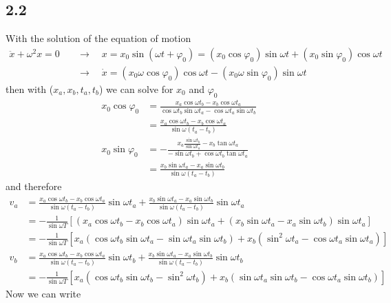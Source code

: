 \documentclass[../main.tex]{subfiles}
\begin{document}
\subsection{2.2}
With the solution of the equation of motion 
\begin{align}
    \ddot x+\omega^2x=0 &\quad\rightarrow\quad x=x_0\sin(\omega t+\varphi_0)=(x_0\cos\varphi_0)\sin \omega t+(x_0\sin\varphi_0)\cos\omega t\\
    &\quad\rightarrow\quad \dot x=(x_0\omega\cos\varphi_0)\cos \omega t-(x_0\omega\sin\varphi_0)\sin\omega t
\end{align}
then with ($x_a,x_b,t_a,t_b$) we can solve for $x_0$ and $\varphi_0$
\begin{align}
    x_0\cos\varphi_0
    &=\frac{x_a\cos\omega t_b-x_b\cos\omega t_a}{\cos\omega t_b\sin\omega t_a-\cos\omega t_a\sin\omega t_b}\\
    &=\frac{x_a\cos\omega t_b-x_b\cos\omega t_a}{\sin\omega(t_a-t_b)}\\
    x_0\sin\varphi_0&=-\frac{x_a\frac{\sin\omega t_b}{\sin\omega t_a}-x_b\tan\omega t_a}{-\sin\omega t_b+\cos\omega t_b\tan\omega t_a}\\
    &=\frac{x_b\sin\omega t_a-x_a\sin\omega t_b}{\sin\omega(t_a-t_b)}
\end{align}
and therefore
\begin{align}
    v_a&=\frac{x_a\cos\omega t_b-x_b\cos\omega t_a}{\sin\omega(t_a-t_b)}\sin\omega t_a+\frac{x_b\sin\omega t_a-x_a\sin\omega t_b}{\sin\omega(t_a-t_b)}\sin\omega t_a\\
    &=-\frac{1}{\sin\omega T}\left[(x_a\cos\omega t_b-x_b\cos\omega t_a)\sin\omega t_a+(x_b\sin\omega t_a-x_a\sin\omega t_b)\sin\omega t_a\right]\\
    &=-\frac{1}{\sin\omega T}\left[x_a(\cos\omega t_b\sin\omega t_a-\sin\omega t_a\sin\omega t_b)+x_b(\sin^2\omega t_a-\cos\omega t_a\sin\omega t_a)\right]\\
    v_b&=\frac{x_a\cos\omega t_b-x_b\cos\omega t_a}{\sin\omega(t_a-t_b)}\sin\omega t_b+\frac{x_b\sin\omega t_a-x_a\sin\omega t_b}{\sin\omega(t_a-t_b)}\sin\omega t_b\\
    &=-\frac{1}{\sin\omega T}\left[x_a(\cos\omega t_b\sin\omega t_b-\sin^2\omega t_b)+x_b(\sin\omega t_a\sin\omega t_b-\cos\omega t_a\sin\omega t_b)\right]
\end{align}
Now we can write
\end{document}

